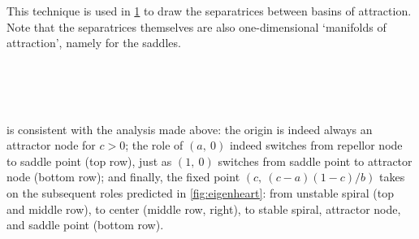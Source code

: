 This technique is used in \cref{fig:beautiful_phase_spaces} to draw the separatrices between basins of attraction. Note that the separatrices themselves are also one-dimensional `manifolds of attraction', namely for the saddles.

\begin{landscape}
\begin{figure}
\vspace{-5.2em}
 \\[2.4em] %
 \\[2.4em]
 \\[0.3em]
\label{fig:beautiful_phase_spaces}
\end{figure}
\end{landscape}

 is consistent with the analysis made above: the origin is indeed always an attractor node for $c > 0$; the role of $(a,\ 0)$ indeed switches from repellor node to saddle point (top row), just as $(1,\ 0)$ switches from saddle point to attractor node (bottom row); and finally, the fixed point $(c,\ (c-a)(1-c)/b)$ takes on the subsequent roles predicted in \cref{fig:eigenheart}: from unstable spiral (top and middle row), to center (middle row, right), to stable spiral, attractor node, and saddle point (bottom row).

